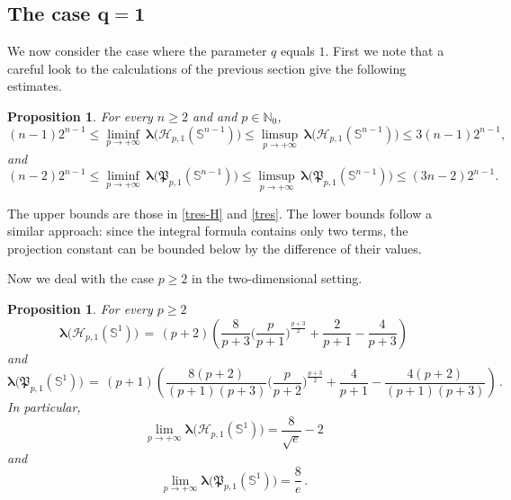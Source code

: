 \documentclass[12pt]{amsart}
\numberwithin{subsection}{section}
\newtheorem{proposition}[theorem]{Proposition}
\theoremstyle{definition}
\theoremstyle{remark}
\begin{document}
\subsection{The case  $\pmb{q=1} $}
We now consider the case where the parameter  $ q $ equals  $1  $. First we note that a careful look to the calculations of the previous section give the following estimates.
\begin{proposition}\label{prop: estimate q=2}
For every $n\ge 2$ and and $p \in \mathbb{N}_0$,
       \begin{equation*}
(n-1)2^{n-1} \le       \liminf_{p \to + \infty} \, \boldsymbol{\lambda}\big(\mathcal{H}_{p,1}(\mathbb{S}^{n-1})\big)
  \leq \limsup_{p \to + \infty} \, \boldsymbol{\lambda}\big(\mathcal{H}_{p,1}(\mathbb{S}^{n-1})\big)
  \leq 3(n-1){2^{n-1}},
  \end{equation*}
and 
\begin{equation*}
(n-2)2^{n-1} \le       \liminf_{p \to + \infty} \, \boldsymbol{\lambda}\big(\mathfrak{P}_{p,1}(\mathbb{S}^{n-1})\big)
  \leq \limsup_{p \to + \infty} \, \boldsymbol{\lambda}\big(\mathfrak{P}_{p,1}(\mathbb{S}^{n-1})\big)
  \leq (3n-2){2^{n-1}}.
  \end{equation*}
\end{proposition}
The upper bounds are those in \eqref{tres-H}
and \eqref{tres}. The lower bounds follow a similar approach: since the integral formula contains only two terms, the projection constant can be bounded below by the difference of their values.

Now we deal with the case  $p \geq 2 $ in the two-dimensional setting.

\begin{proposition} \label{nazibude}
  For every  $p \ge 2  $
  \[
  \boldsymbol{\lambda}\big(\mathcal{H}_{p,1}(\mathbb{S}^{1})\big)
  \,= \,(p+2)  \left( \frac{8}{p+3}\Big( \frac{p}{p+1}\Big)^{\frac{p+3}{2}} + \frac{2}{p+1} -\frac{4}{p+3}\right)
  \]
  and
  \[
  \boldsymbol{\lambda}\big(\mathfrak{P}_{p,1}(\mathbb{S}^{1})\big)
  \,= \,(p+1)  \left( \frac{8(p+2)}{(p+1)(p+3)}\Big( \frac{p}{p+2}\Big)^{\frac{p+3}{2}} + \frac{4}{p+1} -\frac{4(p+2)}{(p+1)(p+3)}\right)\,.
  \]
  In particular,
  \[
  \lim_{p \to + \infty} \boldsymbol{\lambda}\big(\mathcal{H}_{p,1}(\mathbb{S}^{1})\big)
    =
  \frac{8}{\sqrt{e}} -2
  \]
  and
    \[
    \lim_{p \to + \infty} \boldsymbol{\lambda}\big(\mathfrak{P}_{p,1}(\mathbb{S}^{1})\big)
  =
  \frac{8}{e}\,.
  \]
      \end{proposition}

      \smallskip
\end{document}
